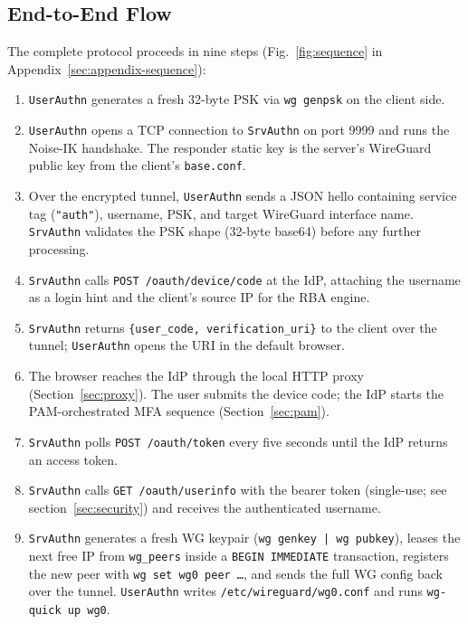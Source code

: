 \subsection{End-to-End Flow}
The complete protocol proceeds in nine steps
(Fig.~\ref{fig:sequence} in Appendix~\ref{sec:appendix-sequence}):

\begin{enumerate}
  \item \texttt{UserAuthn} generates a fresh 32-byte PSK via
    \texttt{wg genpsk} on the client side.
  \item \texttt{UserAuthn} opens a TCP connection to \texttt{SrvAuthn} on
    port 9999 and runs the Noise-IK handshake. The responder static key is
    the server's WireGuard public key from the client's
    \texttt{base.conf}.
  \item Over the encrypted tunnel, \texttt{UserAuthn} sends a JSON hello
    containing service tag (\texttt{"auth"}), username, PSK, and target
    WireGuard interface name. \texttt{SrvAuthn} validates the PSK shape
    (32-byte base64) before any further processing.
  \item \texttt{SrvAuthn} calls \texttt{POST /oauth/device/code} at the
    IdP, attaching the username as a login hint and the client's source IP
    for the RBA engine.
  \item \texttt{SrvAuthn} returns \texttt{\{user\_code, verification\_uri\}}
    to the client over the tunnel; \texttt{UserAuthn} opens the URI in the
    default browser.
  \item The browser reaches the IdP through the local HTTP proxy
    (Section~\ref{sec:proxy}). The user submits the device code; the IdP
    starts the PAM-orchestrated MFA sequence (Section~\ref{sec:pam}).
  \item \texttt{SrvAuthn} polls \texttt{POST /oauth/token} every five
    seconds until the IdP returns an access token.
  \item \texttt{SrvAuthn} calls \texttt{GET /oauth/userinfo} with the
    bearer token (single-use; see section~\ref{sec:security}) and receives the
    authenticated username.
  \item \texttt{SrvAuthn} generates a fresh WG keypair
    (\texttt{wg genkey | wg pubkey}), leases the next free IP from
    \texttt{wg\_peers} inside a \texttt{BEGIN IMMEDIATE} transaction,
    registers the new peer with \texttt{wg set wg0 peer~\dots}, and sends
    the full WG config back over the tunnel.
    \texttt{UserAuthn} writes \texttt{/etc/wireguard/wg0.conf} and runs
    \texttt{wg-quick up wg0}.
\end{enumerate}


